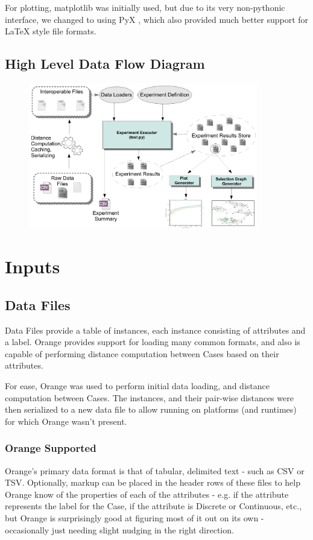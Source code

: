 \documentclass[a4paper,11pt]{report}
\begin{document}
For plotting, matplotlib \citep{prog:matplotlib} was initially used, but due to its very non-pythonic interface, we changed to using PyX \citep{prog:pyx}, which also provided much better support for \LaTeX{} style file formats.

\begin{samepage}
\subsection{High Level Data Flow Diagram}
\begin{figure}[h!] \centering
\includegraphics[width=10cm]{./Drawn/DataFlowDiagram}
\end{figure}
\end{samepage}

\section{Inputs}
\subsection{Data Files}
Data Files provide a table of instances, each instance consisting of attributes and a label. Orange provides support for loading many common formats, and also is capable of performing distance computation between Cases based on their attributes.

For ease, Orange was used to perform initial data loading, and distance computation between Cases. The instances, and their pair-wise distances were then serialized to a new data file to allow running on platforms (and runtimes) for which Orange wasn't present.

\subsubsection{Orange Supported}
Orange's primary data format is that of tabular, delimited text - such as CSV or TSV. Optionally, markup can be placed in the header rows of these files to help Orange know of the properties of each of the attributes - e.g. if the attribute represents the label for the Case, if the attribute is Discrete or Continuous, etc., but Orange is surprisingly good at figuring most of it out on its own - occasionally just needing slight nudging in the right direction.
\end{document}
